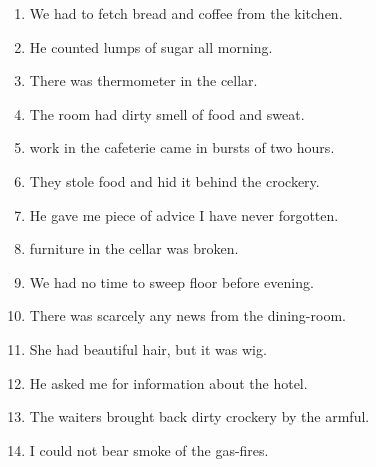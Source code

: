 \documentclass{fiche}
\begin{document}
\entete





\begin{anglais}
\begin{enumerate}[label=\arabic*.,itemsep=2.2mm,leftmargin=*]
  \item We had to fetch  bread and  coffee from the kitchen.
  \item He counted  lumps of sugar all morning.
  \item There was  thermometer in the cellar.
  \item The room had  dirty smell of food and sweat.
  \item {} work in the cafeterie came in bursts of two hours.
  \item They stole  food and hid it behind the crockery.
  \item He gave me  piece of advice I have never forgotten.
  \item {} furniture in the cellar was broken.
  \item We had no time to sweep  floor before evening.
  \item There was  scarcely any news from the dining-room.
  \item She had  beautiful hair, but it was  wig.
  \item He asked me for  information about the hotel.
  \item The waiters brought back  dirty crockery by the armful.
  \item I could not bear  smoke of the gas-fires.
\end{enumerate}
\end{anglais}
\end{document}

